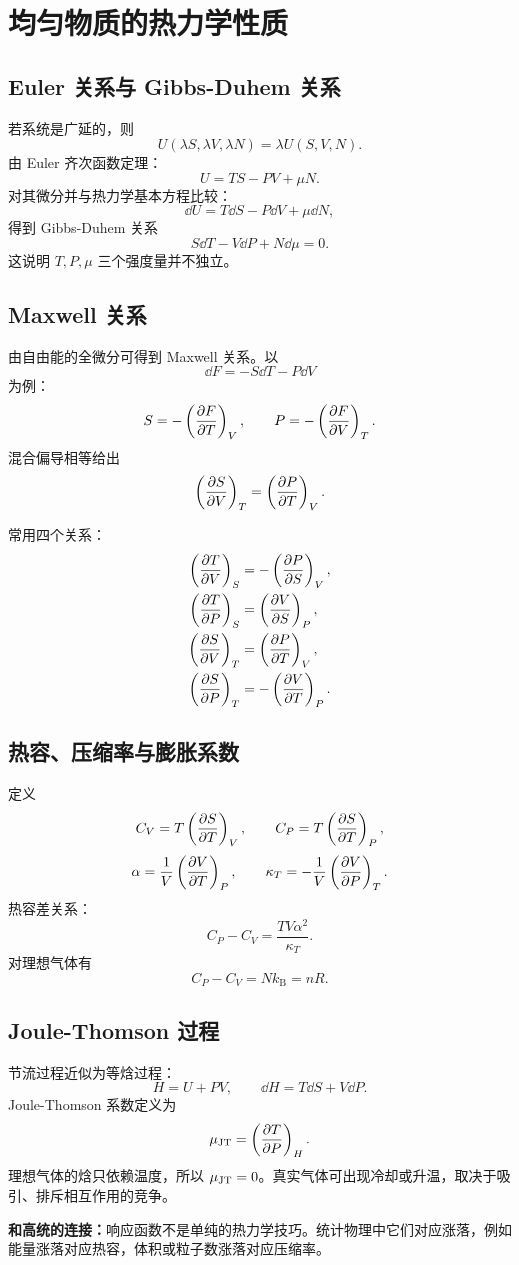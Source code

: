 \chapter{均匀物质的热力学性质}

\section{Euler 关系与 Gibbs-Duhem 关系}

若系统是广延的，则
\[
  U(\lambda S,\lambda V,\lambda N)=\lambda U(S,V,N).
\]
由 Euler 齐次函数定理：
\[
  U = TS-PV+\mu N .
\]
对其微分并与热力学基本方程比较：
\[
  \dd U=T\dd S-P\dd V+\mu\dd N ,
\]
得到 Gibbs-Duhem 关系
\[
  S\dd T - V\dd P + N\dd\mu =0 .
\]
这说明 $T,P,\mu$ 三个强度量并不独立。

\section{Maxwell 关系}

由自由能的全微分可得到 Maxwell 关系。以
\[
  \dd F=-S\dd T-P\dd V
\]
为例：
\[
  S=-\left(\frac{\partial F}{\partial T}\right)_{V},\qquad P=-\left(\frac{\partial F}{\partial V}\right)_{T}.
\]
混合偏导相等给出
\[
  \left(\frac{\partial S}{\partial V}\right)_{T}=\left(\frac{\partial P}{\partial T}\right)_{V}.
\]

常用四个关系：
\[
\begin{aligned}
  \left(\frac{\partial T}{\partial V}\right)_{S}&=-\left(\frac{\partial P}{\partial S}\right)_{V},\\
  \left(\frac{\partial T}{\partial P}\right)_{S}&=\left(\frac{\partial V}{\partial S}\right)_{P},\\
  \left(\frac{\partial S}{\partial V}\right)_{T}&=\left(\frac{\partial P}{\partial T}\right)_{V},\\
  \left(\frac{\partial S}{\partial P}\right)_{T}&=-\left(\frac{\partial V}{\partial T}\right)_{P}.
\end{aligned}
\]

\section{热容、压缩率与膨胀系数}

定义
\[
  C_V=T\left(\frac{\partial S}{\partial T}\right)_{V},\qquad C_P=T\left(\frac{\partial S}{\partial T}\right)_{P},
\]
\[
  \alpha=\frac{1}{V}\left(\frac{\partial V}{\partial T}\right)_{P},\qquad
  \kappa_T=-\frac{1}{V}\left(\frac{\partial V}{\partial P}\right)_{T}.
\]
热容差关系：
\[
  C_P-C_V=\frac{TV\alpha^2}{\kappa_T}.
\]
对理想气体有
\[
  C_P-C_V=Nk_{\mathrm B}=nR.
\]

\section{Joule-Thomson 过程}

节流过程近似为等焓过程：
\[
  H=U+PV,\qquad \dd H=T\dd S+V\dd P .
\]
Joule-Thomson 系数定义为
\[
  \mu_{\rm JT}=\left(\frac{\partial T}{\partial P}\right)_{H}.
\]
理想气体的焓只依赖温度，所以 $\mu_{\rm JT}=0$。真实气体可出现冷却或升温，取决于吸引、排斥相互作用的竞争。

\begin{keybox}
\textbf{和高统的连接：}响应函数不是单纯的热力学技巧。统计物理中它们对应涨落，例如能量涨落对应热容，体积或粒子数涨落对应压缩率。
\end{keybox}

